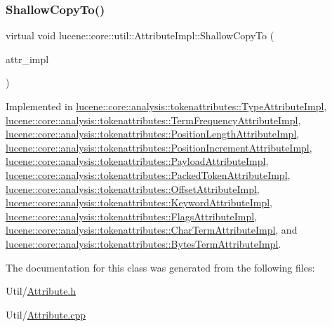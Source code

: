 \subsubsection{\texorpdfstring{Shallow\+Copy\+To()}{ShallowCopyTo()}}
{\footnotesize\ttfamily virtual void lucene\+::core\+::util\+::\+Attribute\+Impl\+::\+Shallow\+Copy\+To (\begin{DoxyParamCaption}\item[{\mbox{\hyperlink{classlucene_1_1core_1_1util_1_1AttributeImpl}{Attribute\+Impl}} \&}]{attr\+\_\+impl }\end{DoxyParamCaption})\hspace{0.3cm}{\ttfamily [pure virtual]}}



Implemented in \mbox{\hyperlink{classlucene_1_1core_1_1analysis_1_1tokenattributes_1_1TypeAttributeImpl_a2eefa7e33a6e060c5493711cd60c9d2e}{lucene\+::core\+::analysis\+::tokenattributes\+::\+Type\+Attribute\+Impl}}, \mbox{\hyperlink{classlucene_1_1core_1_1analysis_1_1tokenattributes_1_1TermFrequencyAttributeImpl_a82c1cb2877fab77b907b4b03795d0fdf}{lucene\+::core\+::analysis\+::tokenattributes\+::\+Term\+Frequency\+Attribute\+Impl}}, \mbox{\hyperlink{classlucene_1_1core_1_1analysis_1_1tokenattributes_1_1PositionLengthAttributeImpl_a657ca7b71ea00d5ba609453d0333cafa}{lucene\+::core\+::analysis\+::tokenattributes\+::\+Position\+Length\+Attribute\+Impl}}, \mbox{\hyperlink{classlucene_1_1core_1_1analysis_1_1tokenattributes_1_1PositionIncrementAttributeImpl_a887e391d3db93f6a8e76b6b464d60547}{lucene\+::core\+::analysis\+::tokenattributes\+::\+Position\+Increment\+Attribute\+Impl}}, \mbox{\hyperlink{classlucene_1_1core_1_1analysis_1_1tokenattributes_1_1PayloadAttributeImpl_ae1104df0b599fd494620e2bce9d39b6c}{lucene\+::core\+::analysis\+::tokenattributes\+::\+Payload\+Attribute\+Impl}}, \mbox{\hyperlink{classlucene_1_1core_1_1analysis_1_1tokenattributes_1_1PackedTokenAttributeImpl_ab89c820321f0f5b84c7a392bb8de32f3}{lucene\+::core\+::analysis\+::tokenattributes\+::\+Packed\+Token\+Attribute\+Impl}}, \mbox{\hyperlink{classlucene_1_1core_1_1analysis_1_1tokenattributes_1_1OffsetAttributeImpl_a426d0cd75306c4ef7cec3c28e34c0029}{lucene\+::core\+::analysis\+::tokenattributes\+::\+Offset\+Attribute\+Impl}}, \mbox{\hyperlink{classlucene_1_1core_1_1analysis_1_1tokenattributes_1_1KeywordAttributeImpl_a83f442881b35bc26a6edb2e04beeb58a}{lucene\+::core\+::analysis\+::tokenattributes\+::\+Keyword\+Attribute\+Impl}}, \mbox{\hyperlink{classlucene_1_1core_1_1analysis_1_1tokenattributes_1_1FlagsAttributeImpl_a9c6a676eb175556a2eea6afaae666f8d}{lucene\+::core\+::analysis\+::tokenattributes\+::\+Flags\+Attribute\+Impl}}, \mbox{\hyperlink{classlucene_1_1core_1_1analysis_1_1tokenattributes_1_1CharTermAttributeImpl_ae37cc1fbce5614f5e60800d3f9f96d33}{lucene\+::core\+::analysis\+::tokenattributes\+::\+Char\+Term\+Attribute\+Impl}}, and \mbox{\hyperlink{classlucene_1_1core_1_1analysis_1_1tokenattributes_1_1BytesTermAttributeImpl_aafc25a873ed04661a26d6a7b5f6d2b0d}{lucene\+::core\+::analysis\+::tokenattributes\+::\+Bytes\+Term\+Attribute\+Impl}}.



The documentation for this class was generated from the following files\+:\begin{DoxyCompactItemize}
\item 
Util/\mbox{\hyperlink{Util_2Attribute_8h}{Attribute.\+h}}\item 
Util/\mbox{\hyperlink{Util_2Attribute_8cpp}{Attribute.\+cpp}}\end{DoxyCompactItemize}
